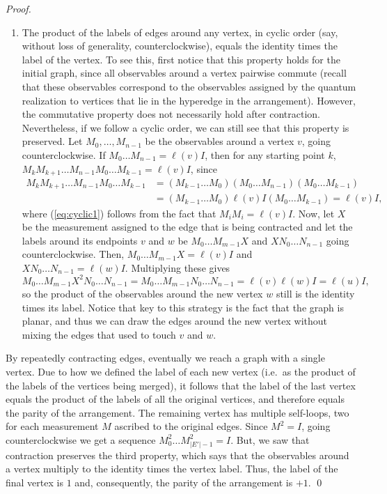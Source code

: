 \documentclass{llncs}
\begin{document}
\begin{proof}
\begin{enumerate}
  \item The product of the labels of edges around any vertex, in
    cyclic order (say, without loss of generality, counterclockwise),
    equals the identity times the label of the vertex. To see this,
    first notice that this property holds for the initial graph, since
    all observables around a vertex pairwise commute (recall that
    these observables correspond to the observables assigned by the
    quantum realization to vertices that lie in the hyperedge in the
    arrangement). However, the commutative property does not
    necessarily hold after contraction. Nevertheless, if we follow a
    cyclic order, we can still see that this property is
    preserved. Let \(M_{0}, \ldots, M_{n-1}\) be the observables
    around a vertex \(v\), going counterclockwise. If
    \(M_{0} \ldots M_{n - 1} = \ell(v) I\), then for any starting
    point \(k\),
    \(M_{k} M_{k+1}\ldots M_{n-1}M_{0}\ldots M_{k-1} = \ell(v) I\),
    since
    \begin{align}
      M_{k}M_{k+1} \ldots M_{n-1}M_{0}\ldots M_{k-1}
      &= (M_{k-1}\ldots M_{0})(M_{0} \ldots M_{n-1})(M_{0}\ldots M_{k-1})  \label{eq:cyclic1} \\
      &= (M_{k-1}\ldots M_{0})\ell(v) I(M_{0}\ldots M_{k-1}) = \ell(v) I,  \label{eq:cyclic2}
    \end{align}
    where (\ref{eq:cyclic1}) follows from the fact that
    \(M_{i} M_{i} = \ell(v) I\). Now, let \(X\) be the measurement assigned to
    the edge that is being contracted and let the labels around its
    endpoints \(v\) and \(w\) be \(M_{0}\ldots M_{m-1}X\) and
    \(X N_{0}\ldots N_{n-1}\) going counterclockwise. Then,
    \(M_{0} \ldots M_{m-1} X = \ell(v)I\) and
    \(X N_{0} \ldots N_{n-1} = \ell(w)I\). Multiplying these gives
    \[
      M_{0}\ldots M_{m-1} X^{2} N_{0} \ldots N_{n-1} =
      M_{0}\ldots M_{m-1} N_{0} \ldots N_{n-1} =
      \ell(v) \ell(w) I = \ell(u) I,
    \]
    so the product of the observables around the new vertex \(w\)
    still is the identity times its label. Notice that key to this
    strategy is the fact that the graph is planar, and thus we can
    draw the edges around the new vertex without mixing the edges that
    used to touch \(v\) and \(w\).
  \end{enumerate}

  By repeatedly contracting edges, eventually we reach a graph with a
  single vertex.  Due to how we defined the label of each new vertex
  (i.e.\ as the product of the labels of the vertices being merged),
  it follows that the label of the last vertex equals the product of
  the labels of all the original vertices, and therefore equals the
  parity of the arrangement. The remaining vertex has multiple
  self-loops, two for each measurement \(M\) ascribed to the original
  edges.  Since \(M^{2} = I\), going counterclockwise we get a
  sequence \(M_{0}^{2} \ldots M_{\vert E'\vert -1}^{2} = I\). But, we
  saw that contraction preserves the third property, which says that
  the observables around a vertex multiply to the identity times the
  vertex label. Thus, the label of the final vertex is \(1\) and,
  consequently, the parity of the arrangement is \(+1\). \qed
\end{proof}
\end{document}
